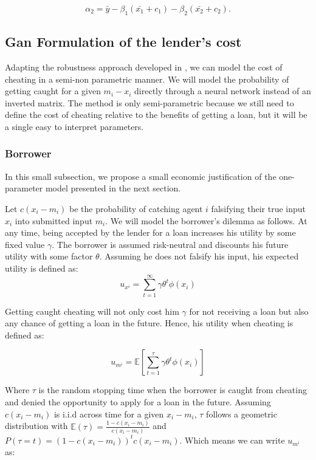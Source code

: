 \documentclass[12pt]{article} %
\begin{document}
\begin{equation} \label{equ:a_two_dim_pert}
\alpha_2=\bar{y}-\beta_{1} (\bar{x_{1}}+c_{1})-\beta_{2} (\bar{x_{2}}+c_{2}).
\end{equation}


\subsection{Gan Formulation of the lender's cost}
\label{sec:simulated_data}
Adapting the robustness approach developed in \cite{hosseini2017blocking}, we can model the cost of cheating in a semi-non parametric manner. We will model the probability of getting caught for a given $m_i-x_i$ directly through a neural network instead of an inverted matrix. The method is only semi-parametric because we still need to define the cost of cheating relative to the benefits of getting a loan, but it will be a single easy to interpret parameters.

 
\subsubsection{Borrower}
In this small subsection, we propose a small economic justification of the one-parameter model presented in the next section. 

Let $c(x_i-m_i)$ be the probability of catching agent $i$ falsifying their true input $x_i$ into submitted input $m_i$. We will model the borrower's dilemma as follows. At any time, being accepted by the lender for a loan increases his utility by some fixed value $\gamma$. The borrower is assumed risk-neutral and discounts his future utility with some factor $\theta$. 
Assuming he does not falsify his input, his expected utility is defined as: 
\begin{equation}
u_{x^{i}} = \sum_{t=1}^{\infty} \gamma \theta^{t} \phi(x_i)
\end{equation}

Getting caught cheating will not only cost him $\gamma$ for not receiving a loan but also any chance of getting a loan in the future. Hence, his utility when cheating is defined as: 

\begin{equation}
u_{m^{i}} = \mathbb{E} \left[ \sum_{t=1}^{\tau} \gamma \theta^{t} \phi(x_i) 
\right]
\end{equation}

Where $\tau$ is the random stopping time when the borrower is caught from cheating and denied the opportunity to apply for a loan in the future. Assuming $c(x_i-m_i)$ is i.i.d across time for a given $x_i-m_i$, $\tau$ follows a geometric distribution with $\mathbb{E}(\tau)= \frac{1-c(x_i-m_i)}{c(x_i-m_i)}$ and $P(\tau=t)=(1-c(x_i-m_i))^tc(x_i-m_i)$. Which means we can write $u_{m^i}$ as: 
\end{document}
